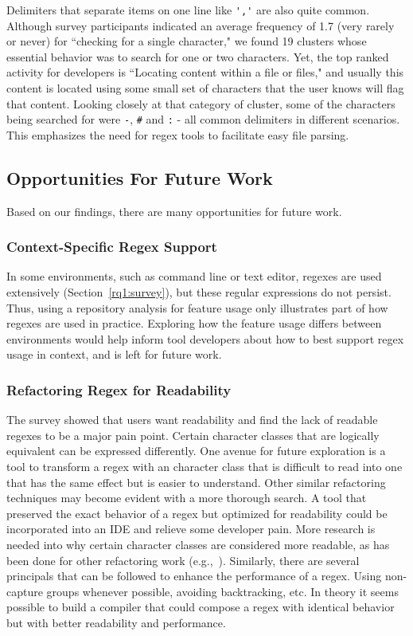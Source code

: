 Delimiters that separate items on one line like \verb!','! are also quite common.  Although survey participants indicated an average frequency of 1.7 (very rarely or never) for ``checking for a single character," we found 19 clusters whose essential behavior was to search for one or two characters.   
Yet, the top ranked activity for developers is ``Locating content within a file or files," and usually this content is located using some small set of characters that the user knows will flag that content.  Looking closely at that category of cluster, some of the characters being searched for were \verb!-!, \verb!#! and \verb!:! - all common delimiters in different scenarios. This emphasizes the need for regex tools to  facilitate easy file parsing. 



\subsection{Opportunities For Future Work}

Based on our findings, there are many opportunities for future work.



\subsubsection{Context-Specific Regex Support}
In some environments, such as command line or text editor, regexes are used extensively (Section~\ref{rq1:survey}), but these regular expressions do not persist. Thus, using a repository analysis for feature usage only illustrates part of how regexes are used in practice. Exploring how the feature usage differs between environments would help inform tool developers about how to best support regex usage in context, and is left for future work.  

\subsubsection{Refactoring Regex for Readability}
The survey showed that users want readability and find the lack of readable regexes to be a major pain point.  Certain character classes that are logically equivalent can be expressed differently.  One avenue for future exploration is a tool to transform a regex with an character class that is difficult to read into one that has the same effect but is easier to understand.
Other similar refactoring techniques may become evident with a more thorough search.  A tool that preserved the exact behavior of a regex but optimized for readability could be incorporated into an IDE and relieve some developer pain.  More research is needed into why certain character classes are considered more readable, as has been done for other refactoring work (e.g.,~\cite{StoleeTSE2013}).
Similarly, there are several principals that can be followed to enhance the performance of a regex.  Using non-capture groups whenever possible, avoiding backtracking, etc.  In theory it seems possible to build a compiler that could compose a regex with identical behavior but with better readability and performance.

